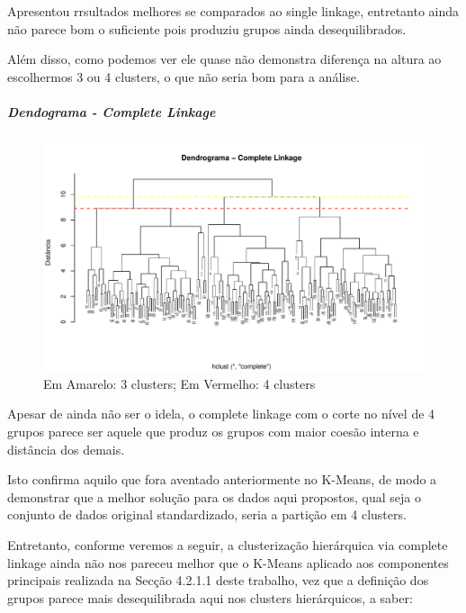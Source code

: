 \documentclass[
  letterpaper,
  DIV=11,
  numbers=noendperiod]{scrartcl}
\let\oldsubparagraph\subparagraph
\renewcommand{\subparagraph}[1]{\oldsubparagraph{#1}\mbox{}}
\begin{document}
Apresentou rrsultados melhores se comparados ao single linkage,
entretanto ainda não parece bom o suficiente pois produziu grupos ainda
desequilibrados.

Além disso, como podemos ver ele quase não demonstra diferença na altura
ao escolhermos 3 ou 4 clusters, o que não seria bom para a análise.

\newpage{}

\subparagraph{Dendograma - Complete
Linkage}\label{dendograma---complete-linkage}

\begin{figure}[H]

{\centering \includegraphics{wines_analysis_files/figure-pdf/unnamed-chunk-40-1.pdf}

}

\caption{Em Amarelo: 3 clusters; Em Vermelho: 4 clusters}

\end{figure}%

Apesar de ainda não ser o idela, o complete linkage com o corte no nível
de 4 grupos parece ser aquele que produz os grupos com maior coesão
interna e distância dos demais.

Isto confirma aquilo que fora aventado anteriormente no K-Means, de modo
a demonstrar que a melhor solução para os dados aqui propostos, qual
seja o conjunto de dados original standardizado, seria a partição em 4
clusters.

Entretanto, conforme veremos a seguir, a clusterização hierárquica via
complete linkage ainda não nos pareceu melhor que o K-Means aplicado aos
componentes principais realizada na Secção 4.2.1.1 deste trabalho, vez
que a definição dos grupos parece mais desequilibrada aqui nos clusters
hierárquicos, a saber:
\end{document}
